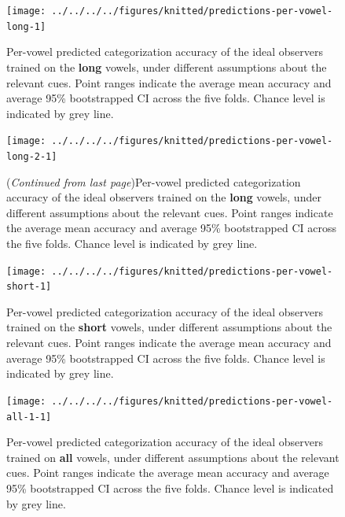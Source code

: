 \documentclass[utf8]{frontiers_suppmat} %
\begin{document}
\begin{landscape}
\begin{figure}[H]

{\centering \texttt{[image: ../../../../figures/knitted/predictions-per-vowel-long-1]} 

}
\caption{Per-vowel predicted categorization accuracy of the ideal observers trained on the \textbf{long} vowels, under different assumptions about the relevant cues. Point ranges indicate the average mean accuracy and average 95\% bootstrapped CI across the five folds. Chance level is indicated by grey line.}\label{fig:predictions-per-vowel-long}
\end{figure}
\end{landscape}



\begin{landscape}

\begin{figure}[H]
{\centering \texttt{[image: ../../../../figures/knitted/predictions-per-vowel-long-2-1]} 

}

\caption{(\emph{Continued from last page})Per-vowel predicted categorization accuracy of the ideal observers trained on the \textbf{long} vowels, under different assumptions about the relevant cues. Point ranges indicate the average mean accuracy and average 95\% bootstrapped CI across the five folds. Chance level is indicated by grey line.}\label{fig:predictions-per-vowel-long-2}
\end{figure}
\end{landscape}



\begin{figure}[H]

{\centering \texttt{[image: ../../../../figures/knitted/predictions-per-vowel-short-1]} 

}

\caption{Per-vowel predicted categorization accuracy of the ideal observers trained on the \textbf{short} vowels, under different assumptions about the relevant cues. Point ranges indicate the average mean accuracy and average 95\% bootstrapped CI across the five folds. Chance level is indicated by grey line.}\label{fig:predictions-per-vowel-short}
\end{figure}



\begin{figure}[H]

{\centering \texttt{[image: ../../../../figures/knitted/predictions-per-vowel-all-1-1]} 

}

\caption{Per-vowel predicted categorization accuracy of the ideal observers trained on \textbf{all} vowels, under different assumptions about the relevant cues. Point ranges indicate the average mean accuracy and average 95\% bootstrapped CI across the five folds. Chance level is indicated by grey line.}\label{fig:predictions-per-vowel-all-1}
\end{figure}
\end{document}
